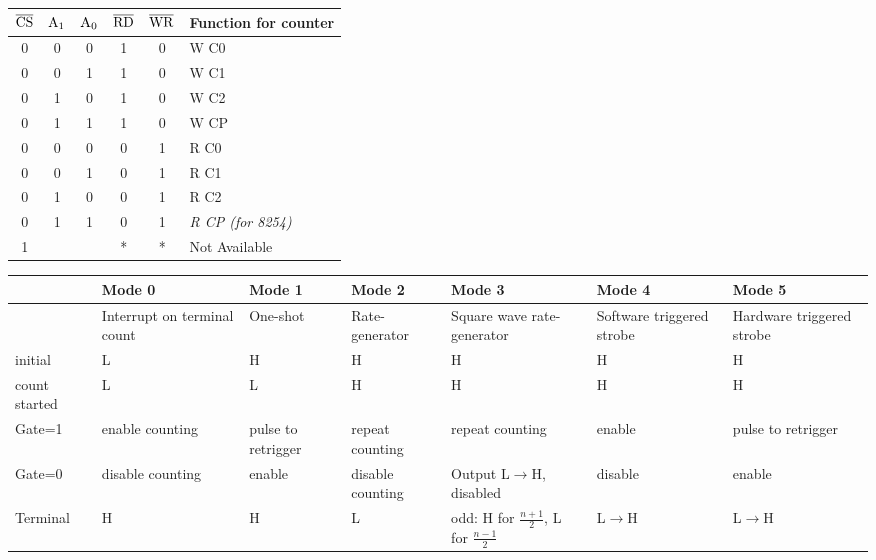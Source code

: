 \begin{table*}
	\begin{minipage}{0.31\textwidth}
		\centering
		\caption{8253 功能信号}
		\begin{tabular}{|ccc|cc|p{5em}|}
			\hline
			$\rm \overline{CS}$ & $\rm A_1$ & $\rm A_0$ & $\rm \overline{RD}$ & $\rm \overline{WR}$ &\bfseries Function for counter\\
			\hline
			0 & 0 & 0 & 1 & 0 & W C0 \\
			\hline
			0 & 0 & 1 & 1 & 0 & W C1 \\
			\hline
			0 & 1 & 0 & 1 & 0 & W C2 \\
			\hline
			0 & 1 & 1 & 1 & 0 & W CP \\
			\hline
			0 & 0 & 0 & 0 & 1 & R C0 \\
			\hline
			0 & 0 & 1 & 0 & 1 & R C1 \\
			\hline
			0 & 1 & 0 & 0 & 1 & R C2 \\
			\hline
			0 & 1 & 1 & 0 & 1 & \textit{R CP (for 8254) }\\
			\hline
			1 &  &  & * & * & Not Available \\
			\hline
		\end{tabular}
	\end{minipage}
	\begin{minipage}{0.77\textwidth}
		\centering
		\caption{8253 模式}
		\begin{tabular}{|p{4em}|p{4em}|p{4em}|p{4em}|p{4em}|p{4em}|p{4em}|}
			\hline
			& Mode 0 & Mode 1 & Mode 2 & Mode 3 & Mode 4 & Mode 5 \\
			\hline
			& Interrupt on terminal count & One-shot & Rate-generator & Square wave rate-generator & Software triggered strobe & Hardware triggered strobe \\
			\hline
			initial & L & H & H & H & H & H \\
			\hline
			count started & L & L & H & H & H & H \\
			\hline
			Gate=1 & enable counting & pulse to retrigger & repeat counting & repeat counting & enable & pulse to retrigger \\
			\hline
			Gate=0 & disable counting & enable & disable counting & Output L$\rightarrow$H, disabled & disable & enable \\
			\hline
			Terminal & H & H & L & odd: H for $\frac{n+1}{2}$, L for $\frac{n-1}{2}$ & L$\rightarrow$H & L$\rightarrow$H \\
			\hline
		\end{tabular}
	\end{minipage}


\end{table*}
